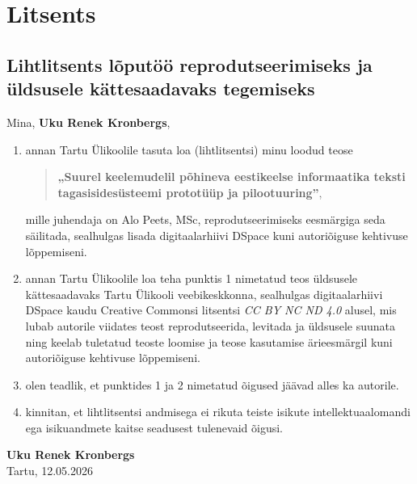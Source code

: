 \section*{Litsents} \label{litsents} 

\subsection*{Lihtlitsents lõputöö reprodutseerimiseks ja üldsusele kättesaadavaks tegemiseks}

\noindent
Mina, \textbf{Uku Renek Kronbergs},

\begin{enumerate}
    \item annan Tartu Ülikoolile tasuta loa (lihtlitsentsi) minu loodud teose
    \begin{quote}
        \textbf{„Suurel keelemudelil põhineva eestikeelse informaatika teksti tagasisidesüsteemi prototüüp ja pilootuuring”},
    \end{quote}
    mille juhendaja on Alo Peets, MSc, reprodutseerimiseks eesmärgiga seda säilitada, sealhulgas lisada digitaalarhiivi DSpace kuni autoriõiguse kehtivuse lõppemiseni.

    \item annan Tartu Ülikoolile loa teha punktis 1 nimetatud teos üldsusele kättesaadavaks Tartu Ülikooli veebikeskkonna, sealhulgas digitaalarhiivi DSpace kaudu Creative Commonsi litsentsi \emph{CC BY NC ND 4.0} alusel, mis lubab autorile viidates teost reprodutseerida, levitada ja üldsusele suunata ning keelab tuletatud teoste loomise ja teose kasutamise ärieesmärgil kuni autoriõiguse kehtivuse lõppemiseni.

    \item olen teadlik, et punktides 1 ja 2 nimetatud õigused jäävad alles ka autorile.

    \item kinnitan, et lihtlitsentsi andmisega ei rikuta teiste isikute intellektuaalomandi ega isikuandmete kaitse seadusest tulenevaid õigusi.
\end{enumerate}

\vspace{2cm}

\noindent\textbf{Uku Renek Kronbergs}\\
Tartu, 12.05.2026
